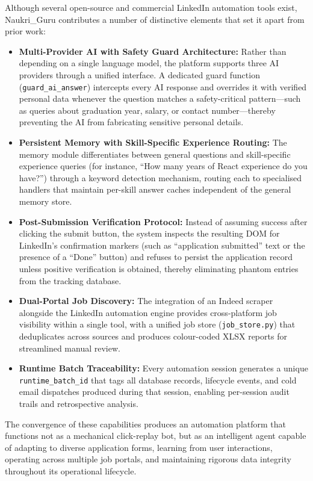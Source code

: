 \documentclass[12pt, a4paper, oneside]{report}
\begin{document}
Although several open-source and commercial LinkedIn automation tools exist, Naukri\_Guru contributes a number of distinctive elements that set it apart from prior work:

\begin{itemize}
    \item \textbf{Multi-Provider AI with Safety Guard Architecture:} Rather than depending on a single language model, the platform supports three AI providers through a unified interface. A dedicated guard function (\texttt{guard\_ai\_answer}) intercepts every AI response and overrides it with verified personal data whenever the question matches a safety-critical pattern---such as queries about graduation year, salary, or contact number---thereby preventing the AI from fabricating sensitive personal details.
    \item \textbf{Persistent Memory with Skill-Specific Experience Routing:} The memory module differentiates between general questions and skill-specific experience queries (for instance, ``How many years of React experience do you have?'') through a keyword detection mechanism, routing each to specialised handlers that maintain per-skill answer caches independent of the general memory store.
    \item \textbf{Post-Submission Verification Protocol:} Instead of assuming success after clicking the submit button, the system inspects the resulting DOM for LinkedIn's confirmation markers (such as ``application submitted'' text or the presence of a ``Done'' button) and refuses to persist the application record unless positive verification is obtained, thereby eliminating phantom entries from the tracking database.
    \item \textbf{Dual-Portal Job Discovery:} The integration of an Indeed scraper alongside the LinkedIn automation engine provides cross-platform job visibility within a single tool, with a unified job store (\texttt{job\_store.py}) that deduplicates across sources and produces colour-coded XLSX reports for streamlined manual review.
    \item \textbf{Runtime Batch Traceability:} Every automation session generates a unique \texttt{runtime\_batch\_id} that tags all database records, lifecycle events, and cold email dispatches produced during that session, enabling per-session audit trails and retrospective analysis.
\end{itemize}

The convergence of these capabilities produces an automation platform that functions not as a mechanical click-replay bot, but as an intelligent agent capable of adapting to diverse application forms, learning from user interactions, operating across multiple job portals, and maintaining rigorous data integrity throughout its operational lifecycle.
\end{document}
